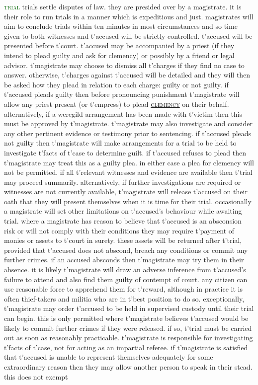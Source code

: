 \documentclass[twoside,11pt,b5paper,twocolumn]{scrbook}
\newcommand{\estcab}[1]{\textsc{\textcolor{marron}{#1}}}
\newcommand{\keyword}[1]{\textcolor{darkgreen}{#1}}
\renewcommand{\paragraph}[1]{\par\noindent\markboth{#1}{#1}\estcab{\keyword{#1}}\label{#1} }
\newcommand{\see}[1]{{\estcab{\hyperref[#1]{#1}}}}
\begin{document}
\paragraph{trial} trials settle disputes of law. they are presided over by a magistrate. it is their role to run trials in a manner which is expeditious and just. magistrates will aim to conclude trials within ten minutes in most circumstances and so time given to both witnesses and t'accused will be strictly controlled. t'accused will be presented before t'court. t'accused may be accompanied by a priest (if they intend to plead guilty and ask for clemency) or possibly by a friend or legal advisor. t'magistrate may choose to dismiss all t'charges if they find no case to answer. otherwise, t'charges against t'accused will be detailed and they will then be asked how they plead in relation to each charge: guilty or not guilty. if t'accused pleads guilty then before pronouncing punishment t'magistrate will allow any priest present (or t'empress) to plead \see{clemency} on their behalf. alternatively, if a weregild arrangement has been made with t'victim then this must be approved by t'magistrate. t'magistrate may also investigate and consider any other pertinent evidence or testimony prior to sentencing. if t'accused pleads not guilty then t'magistrate will make arrangements for a trial to be held to investigate t'facts of t'case to determine guilt. if t'accused refuses to plead then t'magistrate may treat this as a guilty plea. in either case a plea for clemency will not be permitted. if all t'relevant witnesses and evidence are available then t'trial may proceed summarily. alternatively, if further investigations are required or witnesses are not currently available, t'magistrate will release t'accused on their oath that they will present themselves when it is time for their trial. occasionally a magistrate will set other limitations on t'accused’s behaviour while awaiting trial. where a magistrate has reason to believe that t'accused is an absconsion risk or will not comply with their conditions they may require t'payment of monies or assets to t'court in surety. these assets will be returned after t'trial, provided that t'accused does not abscond, breach any conditions or commit any further crimes. if an accused absconds then t'magistrate may try them in their absence. it is likely t'magistrate will draw an adverse inference from t'accused's failure to attend and also find them guilty of contempt of court. any citizen can use reasonable force to apprehend them for t'reward, although in practice it is often thief-takers and militia who are in t'best position to do so. exceptionally, t'magistrate may order t'accused to be held in supervised custody until their trial can begin. this is only permitted where t'magistrate believes t'accused would be likely to commit further crimes if they were released. if so, t'trial must be carried out as soon as reasonably practicable. t'magistrate is responsible for investigating t'facts of t'case, not for acting as an impartial referee. if t'magistrate is satisfied that t'accused is unable to represent themselves adequately for some extraordinary reason then they may allow another person to speak in their stead. this does not exempt 
\end{document}
